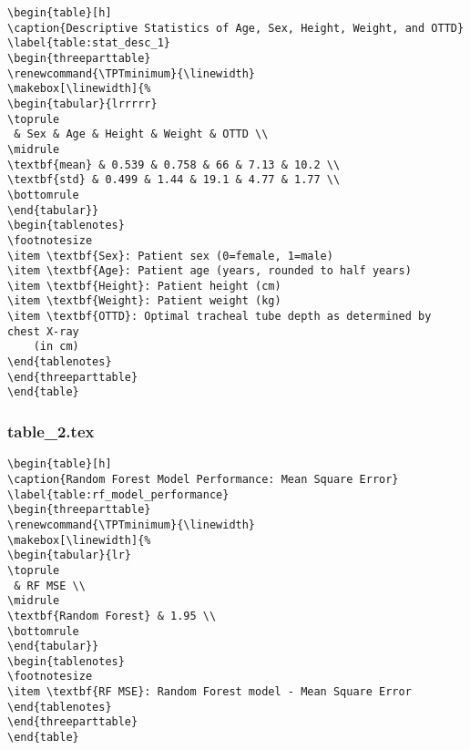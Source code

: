 \documentclass[11pt]{article}
\begin{document}
\begin{Verbatim}[tabsize=4]
\begin{table}[h]
\caption{Descriptive Statistics of Age, Sex, Height, Weight, and OTTD}
\label{table:stat_desc_1}
\begin{threeparttable}
\renewcommand{\TPTminimum}{\linewidth}
\makebox[\linewidth]{%
\begin{tabular}{lrrrrr}
\toprule
 & Sex & Age & Height & Weight & OTTD \\
\midrule
\textbf{mean} & 0.539 & 0.758 & 66 & 7.13 & 10.2 \\
\textbf{std} & 0.499 & 1.44 & 19.1 & 4.77 & 1.77 \\
\bottomrule
\end{tabular}}
\begin{tablenotes}
\footnotesize
\item \textbf{Sex}: Patient sex (0=female, 1=male)
\item \textbf{Age}: Patient age (years, rounded to half years)
\item \textbf{Height}: Patient height (cm)
\item \textbf{Weight}: Patient weight (kg)
\item \textbf{OTTD}: Optimal tracheal tube depth as determined by chest X-ray
	(in cm)
\end{tablenotes}
\end{threeparttable}
\end{table}

\end{Verbatim}

\subsubsection*{table\_2.tex}

\begin{Verbatim}[tabsize=4]
\begin{table}[h]
\caption{Random Forest Model Performance: Mean Square Error}
\label{table:rf_model_performance}
\begin{threeparttable}
\renewcommand{\TPTminimum}{\linewidth}
\makebox[\linewidth]{%
\begin{tabular}{lr}
\toprule
 & RF MSE \\
\midrule
\textbf{Random Forest} & 1.95 \\
\bottomrule
\end{tabular}}
\begin{tablenotes}
\footnotesize
\item \textbf{RF MSE}: Random Forest model - Mean Square Error
\end{tablenotes}
\end{threeparttable}
\end{table}

\end{Verbatim}
\end{document}
